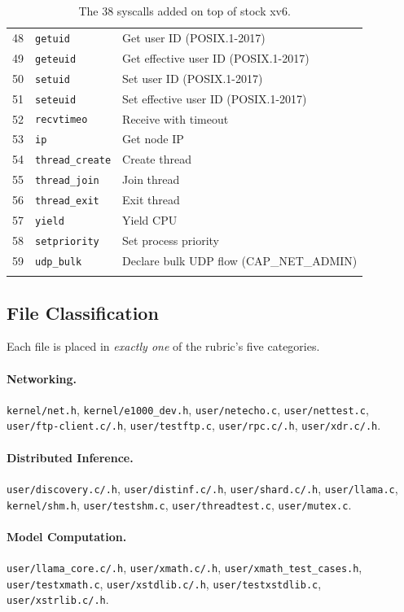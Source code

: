 \documentclass[11pt,a4paper]{article}
\begin{document}
\begin{longtable}{@{}p{0.7cm}p{3.2cm}p{9.5cm}@{}}
48 & \texttt{getuid} & Get user ID (POSIX.1-2017) \\
49 & \texttt{geteuid} & Get effective user ID (POSIX.1-2017) \\
50 & \texttt{setuid} & Set user ID (POSIX.1-2017) \\
51 & \texttt{seteuid} & Set effective user ID (POSIX.1-2017) \\
52 & \texttt{recvtimeo} & Receive with timeout \\
53 & \texttt{ip} & Get node IP \\
54 & \texttt{thread\_create} & Create thread \\
55 & \texttt{thread\_join} & Join thread \\
56 & \texttt{thread\_exit} & Exit thread \\
57 & \texttt{yield} & Yield CPU \\
58 & \texttt{setpriority} & Set process priority \\
59 & \texttt{udp\_bulk} & Declare bulk UDP flow (CAP\_NET\_ADMIN) \\
\bottomrule
\caption{The 38 syscalls added on top of stock xv6.}
\end{longtable}

\subsection{File Classification}

Each file is placed in \emph{exactly one} of the rubric's five categories.

\paragraph{Networking.}
\texttt{kernel/net.h}, \texttt{kernel/e1000\_dev.h}, \texttt{user/netecho.c}, \texttt{user/nettest.c}, \texttt{user/ftp-client.c/.h}, \texttt{user/testftp.c}, \texttt{user/rpc.c/.h}, \texttt{user/xdr.c/.h}.

\paragraph{Distributed Inference.}
\texttt{user/discovery.c/.h}, \texttt{user/distinf.c/.h}, \texttt{user/shard.c/.h}, \texttt{user/llama.c}, \texttt{kernel/shm.h}, \texttt{user/testshm.c}, \texttt{user/threadtest.c}, \texttt{user/mutex.c}.

\paragraph{Model Computation.}
\texttt{user/llama\_core.c/.h}, \texttt{user/xmath.c/.h}, \texttt{user/xmath\_test\_cases.h}, \texttt{user/testxmath.c}, \texttt{user/xstdlib.c/.h}, \texttt{user/testxstdlib.c}, \texttt{user/xstrlib.c/.h}.
\end{document}
